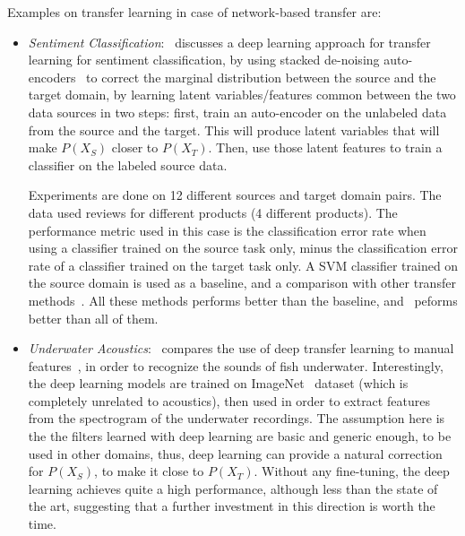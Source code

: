   \par Examples on transfer learning in case of network-based transfer are:
  \begin{itemize}
    \item \textit{Sentiment Classification}:~\citep{glorot2011domain} discusses a deep learning approach for transfer learning for sentiment classification, by using stacked de-noising auto-encoders~\citep{vincent2008extracting} to correct the marginal distribution between the source and the target domain, by learning latent variables/features common between the two data sources in two steps: first, train an auto-encoder on the unlabeled data from the source and the target. This will produce latent variables that will make $P(X_S)$ closer to $P(X_T)$. Then, use those latent features to train a classifier on the labeled source data.

    Experiments are done on 12 different sources and target domain pairs. The data used reviews for different products (4 different products). The performance metric used in this case is the classification error rate when using a classifier trained on the source task only, minus the classification error rate of a classifier trained on the target task only. A SVM classifier trained on the source domain is used as a baseline, and a comparison with other transfer methods~\citep{blitzer2006domain,li2008multi,pan2010cross}. All these methods performs better than the baseline, and~\citep{glorot2011domain} peforms better than all of them.

    \item \textit{Underwater Acoustics}:~\citep{malfante2018use} compares the use of deep transfer learning to manual features~\citep{malfante2016automatic,malfante2018machine}, in order to recognize the sounds of fish underwater. Interestingly, the deep learning models are trained on ImageNet~\citep{imagenet_cvpr09} dataset (which is completely unrelated to acoustics), then used in order to extract features from the spectrogram of the underwater recordings. The assumption here is the the filters learned with deep learning are basic and generic enough, to be used in other domains, thus, deep learning can provide a natural correction for $P(X_S)$, to make it close to $P(X_T)$. Without any fine-tuning, the deep learning achieves quite a high performance, although less than the state of the art, suggesting that a further investment in this direction is worth the time.


\end{itemize}
